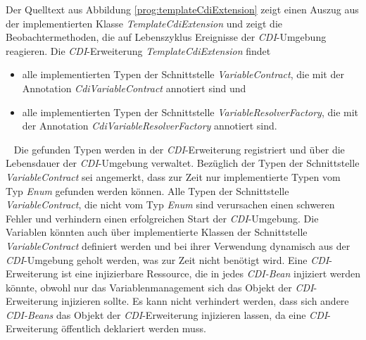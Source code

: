 \newline
\newline
Der Quelltext aus Abbildung \ref{prog:templateCdiExtension} zeigt einen Auszug aus der implementierten Klasse \emph{TemplateCdiExtension} und zeigt die Beobachtermethoden, die auf Lebenszyklus Ereignisse der \emph{CDI}-Umgebung reagieren. Die  \emph{CDI}-Erweiterung \emph{TemplateCdiExtension} findet
\begin{itemize}
	\item alle implementierten Typen der Schnittstelle \emph{VariableContract}, die mit der Annotation \emph{CdiVariableContract} annotiert sind und
	\item alle implementierten Typen der Schnittstelle \emph{VariableResolverFactory}, die mit der Annotation \emph{CdiVariableResolverFactory} annotiert sind.
\end{itemize}
\ \newline
Die gefunden Typen werden in der \emph{CDI}-Erweiterung registriert und über die Lebensdauer der \emph{CDI}-Umgebung verwaltet. Bezüglich der Typen der Schnittstelle \emph{VariableContract} sei angemerkt, dass zur Zeit nur implementierte Typen vom Typ \emph{Enum} gefunden werden können. Alle Typen der Schnittstelle \emph{VariableContract}, die nicht vom Typ \emph{Enum} sind verursachen einen schweren Fehler und verhindern einen erfolgreichen Start der \emph{CDI}-Umgebung. Die Variablen könnten auch über implementierte Klassen der Schnittstelle \emph{VariableContract} definiert werden und bei ihrer Verwendung dynamisch aus der \emph{CDI}-Umgebung geholt werden, was zur Zeit nicht benötigt wird.
\newline
\newline
Eine \emph{CDI}-Erweiterung ist eine injizierbare Ressource, die in jedes \emph{CDI-Bean} injiziert werden könnte, obwohl nur das Variablenmanagement sich das Objekt der \emph{CDI}-Erweiterung injizieren sollte. Es kann nicht verhindert werden, dass sich andere \emph{CDI-Beans} das Objekt der \emph{CDI}-Erweiterung injizieren lassen, da eine \emph{CDI}-Erweiterung öffentlich deklariert werden muss.
\newpage

